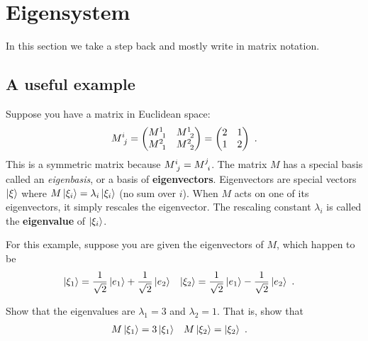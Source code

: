 \documentclass[12pt, oneside]{report}    %
\let\oldsection\section
\def\section{%
  \setcounter{sidenote}{1}%
  \oldsection
}
\begin{document}
\chapter{Eigensystem}

In this section we take a step back and mostly write in matrix notation. 

\section{A useful example}

Suppose you have a matrix in Euclidean space:
\begin{align}
    M\aij{i}{j} =
    \begin{pmatrix}
        M\aij{1}{1} & M\aij{1}{2} \\
        M\aij{2}{1} & M\aij{2}{2}
    \end{pmatrix}=
    \begin{pmatrix}
        2 & 1 \\
        1 & 2
    \end{pmatrix} \ .
\end{align}
This is a symmetric matrix because $M\aij{i}{j} = M\aij{j}{i}$. The matrix $M$ has a special basis called an \emph{eigenbasis}, or a basis of \textbf{eigenvectors}. Eigenvectors are special vectors $\left|\xi\right\rangle$ where $M\left|\xi_i\right\rangle = \lambda_i \left|\xi_i\right\rangle$ (no sum over $i$). When $M$ acts on one of its eigenvectors, it simply rescales  the eigenvector. The rescaling constant $\lambda_i$ is called the \textbf{eigenvalue} of $\left|\xi_i\right\rangle$.


For this example, suppose you are given the eigenvectors of $M$, which happen to be
\begin{align}
    \left|\xi_1\right\rangle &= \frac{1}{\sqrt{2}}\left|e_1\right\rangle + \frac{1}{\sqrt{2}}\left|e_2\right\rangle
    &
    \left|\xi_2\right\rangle &= \frac{1}{\sqrt{2}}\left|e_1\right\rangle - \frac{1}{\sqrt{2}}\left|e_2\right\rangle \ .
\end{align}

\begin{exercise}
Show that the eigenvalues are $\lambda_1 = 3$ and $\lambda_2 = 1$. That is, show that
\begin{align}
M\left|\xi_1\right\rangle &= 3 \left|\xi_1\right\rangle
&
M\left|\xi_2\right\rangle &=  \left|\xi_2\right\rangle \ .
\end{align}
\end{exercise}
\end{document}
